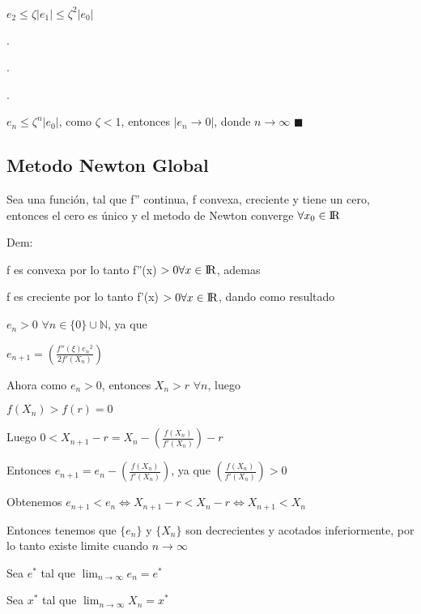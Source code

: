 \documentclass{article}
\begin{document}
 $e_2 \leq \zeta|e_1| \leq \zeta^2|e_0| $

.

.

.

 $e_n \leq \zeta^n|e_0| $, como $ \zeta < 1$, entonces $|e_n \rightarrow 0| $, donde $ n \rightarrow \infty $ $\blacksquare$

\vspace{10mm}

\subsection{Metodo Newton Global}\label{Metodo-Newton-Global}

Sea una función, tal que f'' continua, f convexa, creciente y tiene un cero, entonces el cero es único y el metodo de Newton
converge $ \forall x_0 \in {\rm I\!R} $

\vspace{5mm}

Dem: 

f es convexa por lo tanto f''(x) $ > 0 \forall x \in {\rm I\!R}$, ademas

f es creciente por lo tanto f'(x) $ > 0 \forall x \in {\rm I\!R}$, dando como resultado

$e_n > 0$  $ \forall n \in \{ 0 \}\cup \mathbb{N}$, ya que

$e_{n+1} = \left( \displaystyle\frac{f''(\xi){e_n}^2}{2f'(X_n)} \right)  $

Ahora como $e_n>0$, entonces $ X_n > r $ $ \forall n$, luego

$f(X_n)>f(r)=0$

Luego $0< X_{n+1}-r = X_n - \left( \displaystyle\frac{f(X_n)}{f'(X_n)} \right) -r $

Entonces $e_{n+1} = e_n - \left( \displaystyle\frac{f(X_n)}{f'(X_n)} \right) $, ya que $ \left( \displaystyle\frac{f(X_n)}{f'(X_n)} \right) > 0$ 

\vspace{5mm}

Obtenemos $e_{n+1} < e_n \Longleftrightarrow X_{n+1}-r < X_n -r \Longleftrightarrow X_{n+1} < X_n $

Entonces tenemos que $\{ e_n \}$ y $\{ X_n \}$ son decrecientes y acotados inferiormente, por lo tanto existe limite cuando $ n \rightarrow \infty$

Sea $e^*$ tal que $\lim_{n \to \infty} e_n  = e^*$

Sea $x^*$ tal que $\lim_{n \to \infty} X_n  = x^*$
\end{document}
